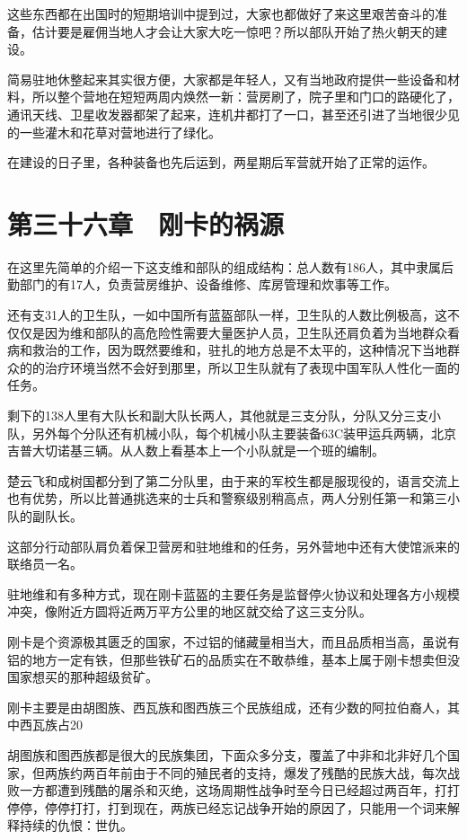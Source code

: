 这些东西都在出国时的短期培训中提到过，大家也都做好了来这里艰苦奋斗的准备，估计要是雇佣当地人才会让大家大吃一惊吧？所以部队开始了热火朝天的建设。

简易驻地休整起来其实很方便，大家都是年轻人，又有当地政府提供一些设备和材料，所以整个营地在短短两周内焕然一新：营房刷了，院子里和门口的路硬化了，通讯天线、卫星收发器都架了起来，连机井都打了一口，甚至还引进了当地很少见的一些灌木和花草对营地进行了绿化。

在建设的日子里，各种装备也先后运到，两星期后军营就开始了正常的运作。

\section{第三十六章　刚卡的祸源}

在这里先简单的介绍一下这支维和部队的组成结构：总人数有186人，其中隶属后勤部门的有17人，负责营房维护、设备维修、库房管理和炊事等工作。

还有支31人的卫生队，一如中国所有蓝盔部队一样，卫生队的人数比例极高，这不仅仅是因为维和部队的高危险性需要大量医护人员，卫生队还肩负着为当地群众看病和救治的工作，因为既然要维和，驻扎的地方总是不太平的，这种情况下当地群众的的治疗环境当然不会好到那里，所以卫生队就有了表现中国军队人性化一面的任务。

剩下的138人里有大队长和副大队长两人，其他就是三支分队，分队又分三支小队，另外每个分队还有机械小队，每个机械小队主要装备63C装甲运兵两辆，北京吉普大切诺基三辆。从人数上看基本上一个小队就是一个班的编制。

楚云飞和成树国都分到了第二分队里，由于来的军校生都是服现役的，语言交流上也有优势，所以比普通挑选来的士兵和警察级别稍高点，两人分别任第一和第三小队的副队长。

这部分行动部队肩负着保卫营房和驻地维和的任务，另外营地中还有大使馆派来的联络员一名。

驻地维和有多种方式，现在刚卡蓝盔的主要任务是监督停火协议和处理各方小规模冲突，像附近方圆将近两万平方公里的地区就交给了这三支分队。

刚卡是个资源极其匮乏的国家，不过铝的储藏量相当大，而且品质相当高，虽说有铝的地方一定有铁，但那些铁矿石的品质实在不敢恭维，基本上属于刚卡想卖但没国家想买的那种超级贫矿。

刚卡主要是由胡图族、西瓦族和图西族三个民族组成，还有少数的阿拉伯裔人，其中西瓦族占20%

胡图族和图西族都是很大的民族集团，下面众多分支，覆盖了中非和北非好几个国家，但两族约两百年前由于不同的殖民者的支持，爆发了残酷的民族大战，每次战败一方都遭到残酷的屠杀和灭绝，这场周期性战争时至今日已经超过两百年，打打停停，停停打打，打到现在，两族已经忘记战争开始的原因了，只能用一个词来解释持续的仇恨：世仇。

